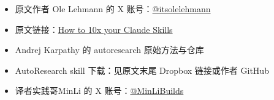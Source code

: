 \begin{itemize}
    \item 原文作者 Ole Lehmann 的 X 账号：\href{https://x.com/itsolelehmann}{@itsolelehmann}
    \item 原文链接：\href{https://x.com/itsolelehmann/status/2033919415771713715}{How to 10x your Claude Skills}
    \item Andrej Karpathy 的 autoresearch 原始方法与仓库
    \item AutoResearch skill 下载：见原文末尾 Dropbox 链接或作者 GitHub
    \item 译者实践哥MinLi 的 X 账号：\href{https://x.com/MinLiBuilds}{@MinLiBuilds}
\end{itemize}



